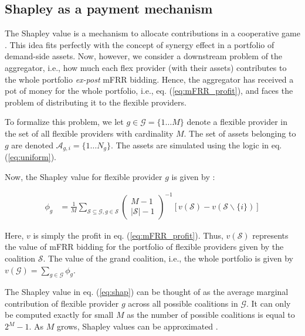 \documentclass[lettersize,journal]{IEEEtran}
\begin{document}
\subsection{Shapley as a payment mechanism}

The Shapley value is a mechanism to allocate contributions in a cooperative game \cite{shapley1997value}. This idea fits perfectly with the concept of synergy effect in a portfolio of demand-side assets. Now, however, we consider a downstream problem of the aggregator, i.e., how much each flex provider (with their assets) contributes to the whole portfolio \textit{ex-post} mFRR bidding. Hence, the aggregator has received a pot of money for the whole portfolio, i.e., eq. (\ref{eq:mFRR_profit}), and faces the problem of distributing it to the flexible providers.

To formalize this problem, we let $g \in \mathcal{G} = \{1 \hdots M \}$ denote a flexible provider in the set of all flexible providers with cardinality $M$. The set of assets belonging to $g$ are denoted $\mathcal{A}_{g,i} = \{1 \hdots N_g \}$. The assets are simulated using the logic in eq. (\ref{eq:uniform}).

Now, the Shapley value for flexible provider $g$ is given by \cite{shapley1997value}:

\begin{align}\label{eq:shap}
    \phi_g & = \frac{1}{M} \sum_{\mathcal{S} \subseteq \mathcal{G}, g \in \mathcal{S}}\left(\begin{array}{c}
                                                                                                    M-1 \\
                                                                                                    |\mathcal{S}|-1
                                                                                                \end{array}\right)^{-1}[v(\mathcal{S})-v(\mathcal{S} \backslash\{i\})]
\end{align}

Here, $v$ is simply the profit in eq. (\ref{eq:mFRR_profit}). Thus, $v(\mathcal{S})$ represents the value of mFRR bidding for the portfolio of flexible providers given by the coalition $\mathcal{S}$. The value of the grand coalition, i.e., the whole portfolio is given by $v(\mathcal{G}) = \sum_{g \in \mathcal{G}} \phi_{g}$.

The Shapley value  in eq. (\ref{eq:shap}) can be thought of as the average marginal contribution of flexible provider $g$ across all possible coalitions in $\mathcal{G}$. It can only be computed exactly for small $M$ as the number of possible coalitions is equal to $2^{M} - 1$. As $M$ grows, Shapley values can be approximated \cite{castro2009polynomial}.
\end{document}
